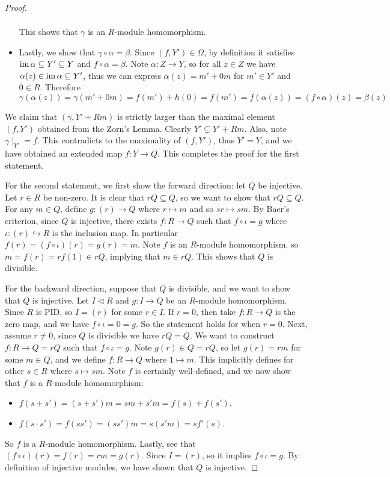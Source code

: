 \begin{proof}
\begin{itemize}
\begin{align*}
        \end{align*}
        This shows that $\gamma$ is an $R$-module homomorphism.
        \item Lastly, we show that $\gamma \circ \alpha = \beta$. Since $(f,Y')\in\Omega$, by definition it satisfies $\operatorname{im}\alpha\subseteq Y'\subseteq Y$ and $f\circ \alpha=\beta$. Note $\alpha:Z\to Y$, so for all $z\in Z$ we have $\alpha(z)\in \operatorname{im} \alpha \subseteq Y'$, thus we can express $\alpha(z)=m' + 0m$ for $m'\in Y'$ and $0\in R$. Therefore
        \[\gamma(\alpha(z)) = \gamma(m'+0m) = f(m')+h(0) = f(m') = f(\alpha(z)) = (f\circ\alpha)(z) = \beta(z)\]
    \end{itemize} 
    We claim that $(\gamma, Y' + Rm)$ is strictly larger than the maximal element $(f,Y')$ obtained from the Zorn's Lemma. Clearly $Y'\subsetneq Y'+Rm$. Also, note $\gamma \mid_{Y'} = f$. This contradicts to the maximality of $(f,Y')$, thus $Y' = Y$, and we have obtained an extended map $f:Y\to Q$. This completes the proof for the first statement.

    For the second statement, we first show the forward direction: let $Q$ be injective. Let $r\in R$ be non-zero. It is clear that $rQ\subseteq Q$, so we want to show that $rQ\subseteq Q$. For any $m\in Q$, define $g:(r)\to Q$ where $r\mapsto m$ and so $sr\mapsto sm$. By Baer's criterion, since $Q$ is injective, there exists $f:R\to Q$ such that $f\circ \iota = g$ where $\iota: (r) \hookrightarrow R$ is the inclusion map. In particular $f(r) = (f\circ \iota)(r) = g(r) = m$. Note $f$ is an $R$-module homomorphism, so $m = f(r) = rf(1)\in rQ$, implying that $m\in rQ$. This shows that $Q$ is divisible.

    For the backward direction, suppose that $Q$ is divisible, and we want to show that $Q$ is injective. Let $I\triangleleft R$ and $g:I\to Q$ be an $R$-module homomorphism. Since $R$ is PID, so $I = (r)$ for some $r\in I$. If $r=0$, then take $f:R\to Q$ is the zero map, and we have $f\circ \iota = 0 = g$. So the statement holds for when $r=0$. Next, assume $r\neq 0$, since $Q$ is divisible we have $rQ = Q$. We want to construct $f:R \to Q = rQ$ such that $f\circ \iota = g$. Note $g(r) \in Q = rQ$, so let $g(r) = rm$ for some $m\in Q$, and we define $f:R\to Q$ where $1\mapsto m$. This implicitly defines for other $s\in R$ where $s \mapsto sm$. Note $f$ is certainly well-defined, and we now show that $f$ is a $R$-module homomorphism:
    \begin{itemize}
        \item $f(s+s') = (s+s')m = sm + s'm = f(s) + f(s')$. 
        \item $f(s\cdot s') = f(ss') = (ss')m = s(s'm) = sf'(s)$. 
    \end{itemize}
    So $f$ is a $R$-module homomorphism. Lastly, see that $(f\circ \iota)(r) = f(r) = rm = g(r)$. Since $I= (r)$, so it implies $f\circ \iota = g$. By definition of injective modules, we have shown that $Q$ is injective.
    

\end{proof}
